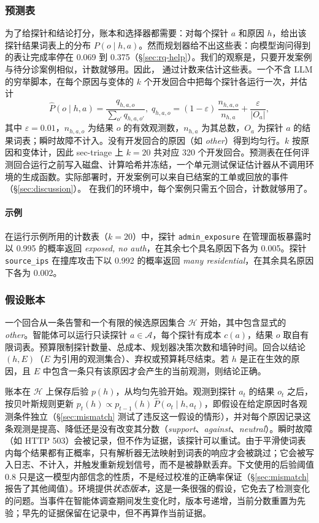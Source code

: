 \subsubsection{预测表}
\label{sec:tables}
为了给探针和结论打分，账本和选择器都需要：对每个探针 $a$ 和原因 $h$，给出该探针结果词表上的分布 $P(o \mid h, a)$。然而规划器给不出这些表：向模型询问得到的表让完成率停在 0.069 到 0.375（\S\ref{sec:rq-help}）。我们的观察是，只要开发案例与待分诊案例相似，计数就够用。因此，\hesp{} 通过计数来估计这些表。一个不含 LLM 的穷举脚本，在每个原因与变体的 $k$ 个开发回合中把每个探针各运行一次，并估计
\[\widehat P(o \mid h, a) = \frac{q_{h,a,o}}{\sum_{o'} q_{h,a,o'}},\; q_{h,a,o} = (1-\varepsilon)\,\frac{n_{h,a,o}}{n_{h,a}} + \frac{\varepsilon}{|O_a|},\]
其中 $\varepsilon = 0.01$，$n_{h,a,o}$ 为结果 $o$ 的有效观测数，$n_{h,a}$ 为其总数，$O_a$ 为探针 $a$ 的结果词表；瞬时故障不计入。没有开发回合的原因（如 \textit{other}）得到均匀行。$k$ 按原因和变体计，因此 sec-triage 上 $k{=}20$ 共对应 320 个开发回合。预测表在任何评测回合运行之前写入磁盘、计算哈希并冻结，一个单元测试保证估计器从不调用环境的生成函数。实际部署时，开发案例可以来自已结案的工单或回放的事件（\S\ref{sec:discussion}）。 在我们的环境中，每个案例只需五个回合，计数就够用了。

\paragraph{示例} 在运行示例所用的计数表（$k{=}20$）中，探针 \texttt{admin\_exposure} 在管理面板暴露时以 0.995 的概率返回 \textit{exposed, no auth}，在其余七个具名原因下各为 0.005。探针 \texttt{source\_ips} 在撞库攻击下以 0.992 的概率返回 \textit{many residential}，在其余具名原因下各为 0.002。

\subsubsection{假设账本}
\label{sec:ledger}
一个回合从一条告警和一个有限的候选原因集合 $\mathcal{H}$ 开始，其中包含显式的 \textit{other}。智能体可以运行只读探针 $a \in \mathcal{A}$，每个探针有成本 $c(a)$，结果 $o$ 取自有限词表。预算限制探针数量、总成本、规划器决策次数和墙钟时间。回合以结论 $(h, E)$（$E$ 为引用的观测集合）、弃权或预算耗尽结束。若 $h$ 是正在生效的原因，且 $E$ 中包含一条只有该原因才会产生的当前观测，则结论正确。

账本在 $\mathcal{H}$ 上保存后验 $p(h)$，从均匀先验开始。观测到探针 $a_t$ 的结果 $o_t$ 之后，按贝叶斯规则更新 $p_t(h) \propto p_{t-1}(h)\, \widehat P(o_t \mid h, a_t)$，即假设在给定原因时各观测条件独立（\S\ref{sec:mismatch} 测试了违反这一假设的情形），并对每个原因记录这条观测是提高、降低还是没有改变其分数（\textit{support}、\textit{against}、\textit{neutral}）。瞬时故障（如 HTTP 503）会被记录，但不作为证据，该探针可以重试。由于平滑使词表内每个结果都有正概率，只有解析器无法映射到词表的响应才会被跳过；它会被写入日志、不计入，并触发重新规划信号，而不是被静默丢弃。下文使用的后验阈值 0.8 只是这一模型内部信念的性质，不是经过校准的正确率保证（\S\ref{sec:mismatch} 报告了其他阈值）。环境提供\emph{状态版本}，这是一条很强的假设，它免去了检测变化的问题。当事件在智能体调查期间发生变化时，版本号递增，当前分数重置为先验；早先的证据保留在记录中，但不再算作当前证据。

